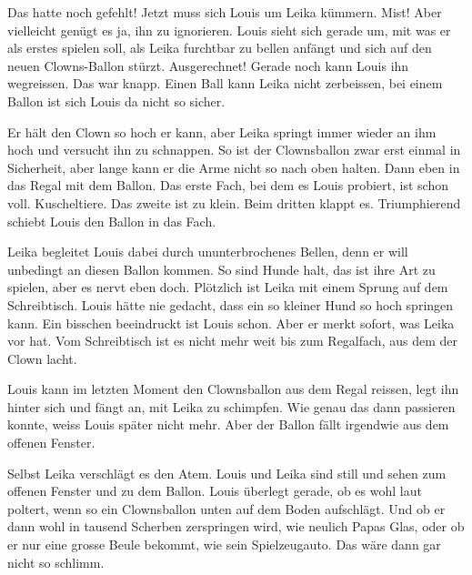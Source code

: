 Das hatte noch gefehlt! Jetzt muss sich Louis um Leika kümmern. Mist! Aber vielleicht genügt es ja, ihn zu ignorieren. Louis sieht sich gerade um, mit was er als erstes spielen soll, als Leika furchtbar zu bellen anfängt und sich auf den neuen Clowns-Ballon stürzt. Ausgerechnet! Gerade noch kann Louis ihn wegreissen. Das war knapp. Einen Ball kann Leika nicht zerbeissen, bei einem Ballon ist sich Louis da nicht so sicher.

Er hält den Clown so hoch er kann, aber Leika springt immer wieder an ihm hoch
und versucht ihn zu schnappen. So ist der Clownsballon zwar erst einmal in
Sicherheit, aber lange kann er die Arme nicht so nach oben halten. Dann eben in
das Regal mit dem Ballon. Das erste Fach, bei dem es Louis probiert, ist schon
voll. Kuscheltiere. Das zweite ist zu klein. Beim dritten klappt es.
Triumphierend schiebt Louis den Ballon in das Fach.

Leika begleitet Louis dabei durch ununterbrochenes Bellen, denn er will unbedingt an diesen Ballon kommen. So sind Hunde halt, das ist ihre Art zu spielen, aber es nervt eben doch. Plötzlich ist Leika mit einem Sprung auf dem Schreibtisch. Louis hätte nie gedacht, dass ein so kleiner Hund so hoch springen kann. Ein bisschen beeindruckt ist Louis schon. Aber er merkt sofort, was Leika vor hat. Vom Schreibtisch ist es nicht mehr weit bis zum Regalfach, aus dem der Clown lacht. 

Louis kann im letzten Moment den Clownsballon aus dem Regal reissen, legt ihn
hinter sich und fängt an, mit Leika zu schimpfen. Wie genau das dann passieren konnte, weiss Louis später nicht mehr. Aber der Ballon fällt irgendwie aus dem offenen Fenster.

Selbst Leika verschlägt es den Atem. Louis und Leika sind still und sehen zum offenen Fenster und zu dem Ballon. Louis überlegt gerade, ob es wohl laut poltert, wenn so ein Clownsballon unten auf dem Boden aufschlägt. Und ob er dann wohl in tausend Scherben zerspringen wird, wie neulich Papas Glas, oder ob er nur eine grosse Beule bekommt, wie sein Spielzeugauto. Das wäre dann gar nicht so schlimm.

